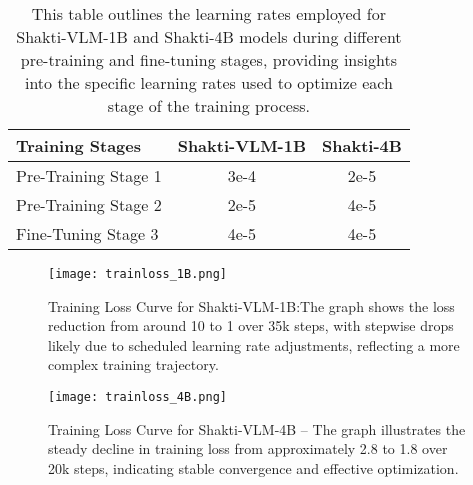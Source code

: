 \documentclass{article}
\begin{document}
\begin{table}[h]
    \centering
    \renewcommand{\arraystretch}{1.3}
    \begin{tabular}{|l|c|c|}
        \hline
        \textbf{Training Stages}   & \textbf{Shakti-VLM-1B} & \textbf{Shakti-4B} \\
        \hline
        Pre-Training Stage 1       & 3e-4               & 2e-5               \\
        \hline
        Pre-Training Stage 2       & 2e-5               & 4e-5               \\
        \hline
        Fine-Tuning Stage 3        & 4e-5               & 4e-5               \\
        \hline
    \end{tabular}
    \vspace{1cm}
    \caption{This table outlines the learning rates employed for Shakti-VLM-1B and Shakti-4B models during different pre-training and fine-tuning stages, providing insights into the specific learning rates used to optimize each stage of the training process.}
    \label{table:shakti-vlm-learning-rates}
\end{table}



\begin{figure}[h]
    \centering
    \texttt{[image: trainloss\_1B.png]}
    \caption{Training Loss Curve for Shakti-VLM-1B:The graph shows the loss reduction from around 10 to 1 over 35k steps, with stepwise drops likely due to scheduled learning rate adjustments, reflecting a more complex training trajectory.}
    \label{fig:1B-trainloss}
\end{figure}
\begin{figure}[h]
    \centering
    \texttt{[image: trainloss\_4B.png]}
    \caption{Training Loss Curve for Shakti-VLM-4B – The graph illustrates the steady decline in training loss from approximately 2.8 to 1.8 over 20k steps, indicating stable convergence and effective optimization.}
    \vspace{0.5cm}
    \label{fig:4B-trainloss}
\end{figure}



\end{document}
